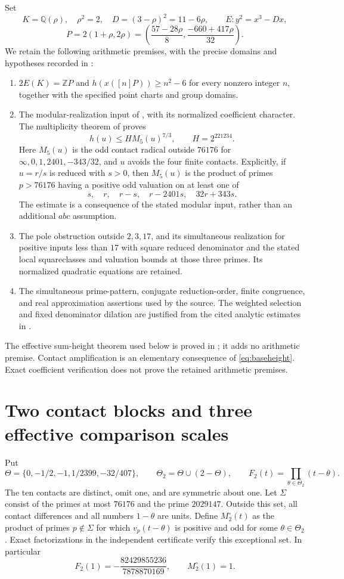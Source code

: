 \documentclass[11pt,a4paper]{article}
\newcommand{\Q}{\mathbb Q}\newcommand{\Z}{\mathbb Z}\newcommand{\HH}{\mathcal H}
\begin{document}
Set
\[
 K=\Q(\rho),\quad \rho^2=2,\quad D=(3-\rho)^2=11-6\rho,
 \qquad E:y^2=x^3-Dx,
\]
\[
 P=2(1+\rho,2\rho)
 =\left(\frac{57-28\rho}{8},\frac{-660+417\rho}{32}\right).
\]
We retain the following arithmetic premises, with the precise domains
and hypotheses recorded in \cite{Dependencies,Source,Weights}:
\begin{enumerate}
\item $2E(K)=\Z P$ and $h(x([n]P))\ge n^2-6$ for every nonzero
integer $n$, together with the specified point charts and group domains.
\item The modular-realization input of
\cite[Definition~6.1]{NewHeight}, with its normalized coefficient
character. The multiplicity theorem of
\cite[Theorem~4.1]{Multiplicity} proves
\begin{equation}\label{eq:baseheight}
 h(u)\le H M_5(u)^{7/3},\qquad H=2^{221234}.
\end{equation}
Here $M_5(u)$ is the odd contact radical outside $76176$ for
$\infty,0,1,2401,-343/32$, and $u$ avoids the four finite contacts.
Explicitly, if $u=r/s$ is reduced with $s>0$, then $M_5(u)$ is
the product of primes $p>76176$ having a positive odd valuation on
at least one of
\[
           s,\quad r,\quad r-s,\quad r-2401s,\quad32r+343s.
\]
The estimate is a consequence of the stated modular input, rather
than an additional $abc$ assumption.
\item The pole obstruction outside $2,3,17$, and its simultaneous
realization for positive inputs less than $17$ with square reduced
denominator and the stated local squareclasses and valuation bounds
at those three primes. Its normalized quadratic equations are retained.
\item The simultaneous prime-pattern, conjugate reduction-order,
finite congruence, and real approximation assertions used by the source.
The weighted selection and fixed denominator dilation are justified
from the cited analytic estimates in \cite{Selection}.
\end{enumerate}
The effective sum-height theorem used below is proved in
\cite{Sums}; it adds no arithmetic premise. Contact amplification is
an elementary consequence of \eqref{eq:baseheight}. Exact coefficient
verification does not prove the retained arithmetic premises.

\section{Two contact blocks and three effective comparison scales}
Put
\[
 \Theta=\{0,-1/2,-1,1/2399,-32/407\},\qquad
 \Theta_2=\Theta\cup(2-\Theta),\qquad
 F_2(t)=\prod_{\theta\in\Theta_2}(t-\theta).
\]
The ten contacts are distinct, omit one, and are symmetric about one.
Let $\Sigma$ consist of the primes at most $76176$ and the prime
$2029147$. Outside this set, all contact differences and all numbers
$1-\theta$ are units. Define $M_2^\circ(t)$ as the product of primes
$p\notin\Sigma$ for which $v_p(t-\theta)$ is positive and odd for
some $\theta\in\Theta_2$. Exact factorizations in the independent
certificate verify this exceptional set. In particular
\[
 F_2(1)=-\frac{82429855236}{7878870169},\qquad M_2^\circ(1)=1.
\]
\end{document}
